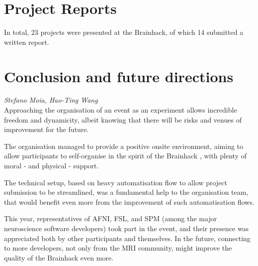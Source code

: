 \documentclass[10pt,a4paper,twocolumns]{proc}
\let\Oldsection\section
\renewcommand{\section}{\FloatBarrier\Oldsection}
\newcommand{\authors}[1]{\emph{\footnotesize #1} \\}
\begin{document}
\section{Project Reports}

In total, 23 projects were presented at the Brainhack, of which 14 submitted a written
report.









\vfill\eject
\columnbreak








\section{Conclusion and future directions}
\authors{Stefano Moia, %
Hao-Ting Wang}
%

Approaching the organisation of an event as an experiment allows
incredible freedom and dynamicity, albeit knowing that there will be
risks and venues of improvement for the future.

The organisation managed to provide a positive onsite environment,
aiming to allow participants to self-organise in the spirit of the
Brainhack \parencite{Gau2021}, with plenty of moral - and physical - support.

The technical setup, based on heavy automatisation flow to allow project
submission to be streamlined, was a fundamental help to the organisation
team, that would benefit even more from the improvement of such
automatisation flows.

This year, representatives of AFNI, FSL, and SPM (among the major
neuroscience software developers) took part in the event, and their
presence was appreciated both by other participants and themselves. In
the future, connecting to more developers, not only from the MRI
community, might improve the quality of the Brainhack even more.
\end{document}
